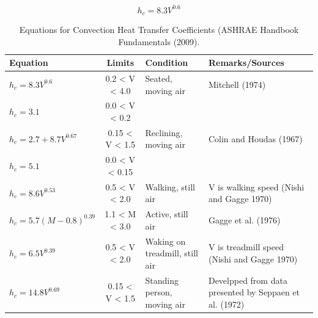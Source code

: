         \begin{equation}
            h_c = 8.3V^{0.6} \label{eq:hc}
        \end{equation}
    \begin{table}[h!]
            \centering
            \begin{tabular}{l|c| p{4.5cm} |p{4cm}}\hline
                 Equation & Limits & Condition & Remarks/Sources \\\hline\hline
                 $h_c = 8.3 V^{0.6}$ & 0.2 < V < 4.0 & Seated, moving air & Mitchell (1974)\\
                 $h_c = 3.1$ & 0.0 < V < 0.2 & &\\
            \hline
                 $h_c = 2.7 + 8.7V^{0.67}$ & 0.15 < V < 1.5 & Reclining, moving air & Colin and Houdas (1967)\\
                 $h_c = 5.1$               & 0.0 < V < 0.15 & & \\\hline

                $h_c = 8.6V^{0.53}$ & 0.5 < V < 2.0 & Walking, still air & V is walking speed (Nishi and Gagge 1970)\\\hline
                $h_c = 5.7(M-0.8)^{0.39}$ & 1.1 < M < 3.0 & Active, still air & Gagge et al. (1976)\\\hline
                $h_c = 6.5V^{0.39}$ & 0.5 < V < 2.0 & Waking on treadmill, still air & V is treadmill speed (Nishi and Gagge 1970)\\\hline
                $h_c = 14.8V^{0.69}$ & 0.15 < V < 1.5 & Standing person, moving air & Develpped from data presented by Seppaen et al. (1972)\\
                \hline
            \end{tabular}
            \caption{Equations for Convection Heat Transfer Coefficients (ASHRAE Handbook Fundamentals (2009).}
            \label{tab:hcs}
    \end{table}

